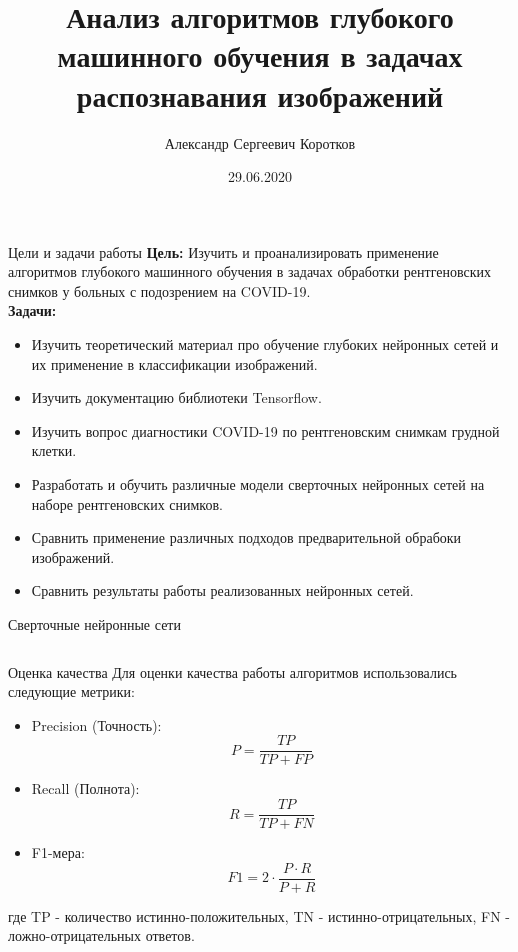 \documentclass[aspectratio=169]{beamer}
\title{Анализ алгоритмов глубокого машинного обучения  в задачах распознавания изображений}
\author[Коротков А.С.]{Александр Сергеевич Коротков}
\institute[]{Научный руководитель: Д.В. Матвеев}
\date{29.06.2020}
\begin{document}
\maketitle
\begin{frame}{Цели и задачи работы}
    \textbf{Цель:} Изучить и проанализировать применение алгоритмов глубокого машинного обучения  в задачах обработки рентгеновских снимков у больных с подозрением на COVID-19. \\
    \textbf{Задачи: }
    \begin{itemize}
        \item Изучить теоретический материал про обучение глубоких нейронных сетей и их применение в классификации изображений.
        \item Изучить документацию библиотеки Tensorflow.
        \item Изучить вопрос диагностики COVID-19 по рентгеновским снимкам грудной клетки.
        \item Разработать и обучить различные модели сверточных нейронных сетей на наборе рентгеновских снимков.
        \item Сравнить применение различных подходов предварительной обрабоки изображений.
        \item Сравнить результаты работы реализованных нейронных сетей.
    \end{itemize}
\end{frame}

\begin{frame}{Сверточные нейронные сети}
    \begin{columns}[T]
        \begin{column}{.4\paperwidth}
            \centering
                
        \end{column}
        \begin{column}{.5\paperwidth}
            
        \end{column}
    \end{columns}   
\end{frame}

\begin{frame}{Оценка качества}
    Для оценки качества работы алгоритмов использовались следующие метрики:
    \begin{itemize}
        \item Precision (Точность): \[P = \frac{TP}{TP+FP}\]
        \item Recall (Полнота): \[R=\frac{TP}{TP+FN}\] 
        \item F1-мера: \[F1=2 \cdot \frac{P \cdot R}{P+R}\] 
    \end{itemize}    
    где TP - количество истинно-положительных, TN - истинно-отрицательных, 
    FN - ложно-отрицательных ответов.
\end{frame}
\end{document}
